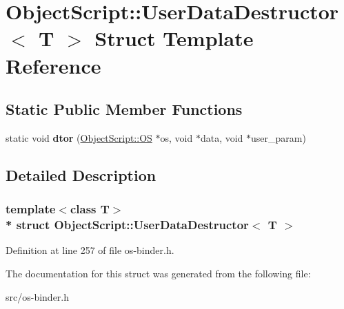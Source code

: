 \hypertarget{struct_object_script_1_1_user_data_destructor}{}\section{Object\+Script\+:\+:User\+Data\+Destructor$<$ T $>$ Struct Template Reference}
\label{struct_object_script_1_1_user_data_destructor}
\subsection*{Static Public Member Functions}
\begin{DoxyCompactItemize}
\item 
static void {\bfseries dtor} (\hyperlink{class_object_script_1_1_o_s}{Object\+Script\+::\+OS} $\ast$os, void $\ast$data, void $\ast$user\+\_\+param)\hypertarget{struct_object_script_1_1_user_data_destructor_a5a3ee8724a23b9ae73ffe77e4797c662}{}\label{struct_object_script_1_1_user_data_destructor_a5a3ee8724a23b9ae73ffe77e4797c662}

\end{DoxyCompactItemize}


\subsection{Detailed Description}
\subsubsection*{template$<$class T$>$\\*
struct Object\+Script\+::\+User\+Data\+Destructor$<$ T $>$}



Definition at line 257 of file os-\/binder.\+h.



The documentation for this struct was generated from the following file\+:\begin{DoxyCompactItemize}
\item 
src/os-\/binder.\+h\end{DoxyCompactItemize}
